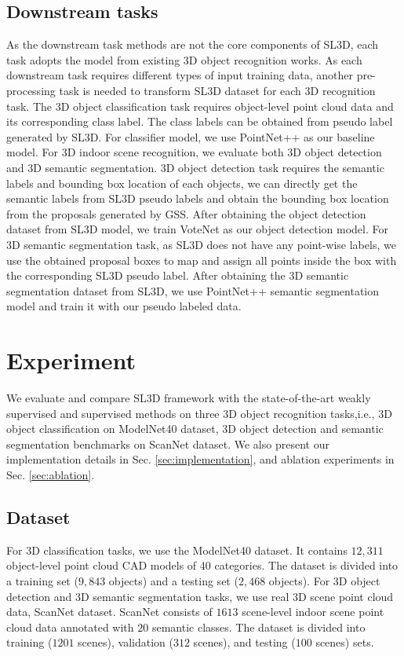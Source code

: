 \documentclass{article}
\begin{document}
\subsection{Downstream tasks}

As the downstream task methods are not the core components of SL3D, each task adopts the model from existing 3D object recognition works. As each downstream task requires different types of input training data, another pre-processing task is needed to transform SL3D dataset for each 3D recognition task. The 3D object classification task requires object-level point cloud data and its corresponding class label. The class labels can be obtained from pseudo label generated by SL3D. For classifier model, we use PointNet++ \cite{qi2017pointnetplusplus} as our baseline model. For 3D indoor scene recognition, we evaluate both 3D object detection and 3D semantic segmentation. 3D object detection task requires the semantic labels and bounding box location of each objects, we can directly get the semantic labels from SL3D pseudo labels and obtain the bounding box location from the proposals generated by GSS. After obtaining the object detection dataset from SL3D model, we train VoteNet \cite{qi2019deep} as our object detection model. For 3D semantic segmentation task, as SL3D does not have any point-wise labels, we use the obtained proposal boxes to map and assign all points inside the box with the corresponding SL3D pseudo label. After obtaining the 3D semantic segmentation dataset from SL3D, we use PointNet++ \cite{qi2017pointnetplusplus} semantic segmentation model and train it with our pseudo labeled data.

\section{Experiment}
\label{sec:exp}
We evaluate and compare SL3D framework with the state-of-the-art weakly supervised and supervised methods on three 3D object recognition tasks,i.e., 3D object classification on ModelNet40 \cite{wu20153d} dataset, 3D object detection and semantic segmentation benchmarks on ScanNet \cite{dai2017scannet} dataset. We also present our implementation details in Sec. \ref{sec:implementation}, and ablation experiments in Sec. \ref{sec:ablation}.

\subsection{Dataset} 
For 3D classification tasks, we use the ModelNet40 dataset. It contains $12,311$ object-level point cloud CAD models of $40$ categories. The dataset is divided into a training set ($9,843$ objects) and a testing set ($2,468$ objects). For 3D object detection and 3D semantic segmentation tasks, we use real 3D scene point cloud data, ScanNet \cite{dai2017scannet} dataset. ScanNet consists of $1613$ scene-level indoor scene point cloud data annotated with $20$ semantic classes. The dataset is divided into training ($1201$ scenes), validation ($312$ scenes), and testing ($100$ scenes) sets. 
\end{document}
